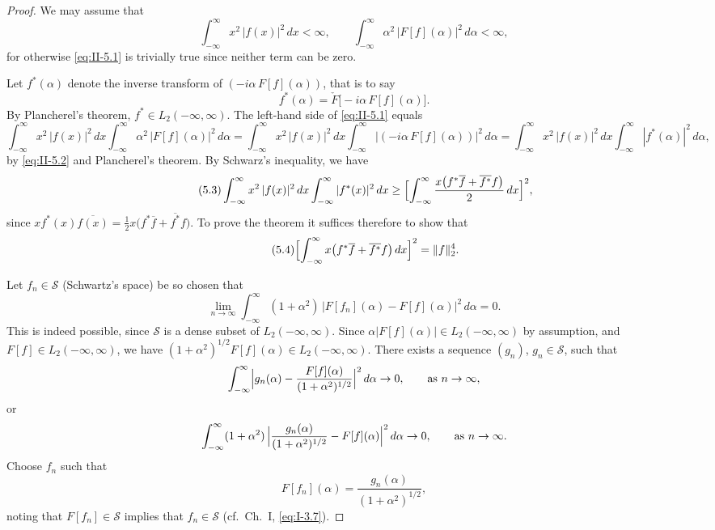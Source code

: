 \begin{proof}
We may assume that
\[
\int_{-\infty}^{\infty}x^{2}\,|f(x)|^{2}\,dx<\infty,\qquad
\int_{-\infty}^{\infty}\alpha^{2}\,|F[f](\alpha)|^{2}\,d\alpha<\infty,
\]
for otherwise \eqref{eq:II-5.1} is trivially true since neither term can be zero.

Let $f^{*}(\alpha)$ denote the inverse transform of $(-i\alpha\,F[f](\alpha))$, that is to say
\begin{equation}\tag{5.2}\label{eq:II-5.2}
f^{*}(\alpha)=\check F\bigl[-i\alpha\,F[f](\alpha)\bigr].
\end{equation}
By Plancherel's theorem, $f^{*}\in L_{2}(-\infty,\infty)$. The left-hand side of \eqref{eq:II-5.1} equals
\[
\int_{-\infty}^{\infty}x^{2}\,|f(x)|^{2}\,dx
\int_{-\infty}^{\infty}\alpha^{2}\,|F[f](\alpha)|^{2}\,d\alpha
=\int_{-\infty}^{\infty}x^{2}\,|f(x)|^{2}\,dx
\int_{-\infty}^{\infty}\bigl|(-i\alpha\,F[f](\alpha))\bigr|^{2}\,d\alpha
=\int_{-\infty}^{\infty}x^{2}\,|f(x)|^{2}\,dx
\int_{-\infty}^{\infty}|f^{*}(\alpha)|^{2}\,d\alpha,
\]
by \eqref{eq:II-5.2} and Plancherel's theorem. By Schwarz's inequality, we have
\begin{equation}\tag{5.3}\label{eq:II-5.3}
\int_{-\infty}^{\infty}x^{2}\,|f(x)|^{2}\,dx
\int_{-\infty}^{\infty}|f^{*}(x)|^{2}\,dx
\ge \Bigl[\int_{-\infty}^{\infty}\frac{x\bigl(f^{*}\overline{f}+\overline{f^{*}}f\bigr)}{2}\,dx\Bigr]^{2},
\end{equation}
since $x f^{*}(x)\overline{f(x)}=\frac{1}{2}x\bigl(f^{*}\overline{f}+\overline{f^{*}}f\bigr)$. To prove the theorem it suffices therefore to show that
\begin{equation}\tag{5.4}\label{eq:II-5.4}
\Bigl[\int_{-\infty}^{\infty}x\bigl(f^{*}\overline{f}+\overline{f^{*}}f\bigr)\,dx\Bigr]^{2}=\|f\|_{2}^{4}.
\end{equation}

Let $f_{n}\in\mathcal S$ (Schwartz's space) be so chosen that
\begin{equation}\tag{5.5}\label{eq:II-5.5}
\lim_{n\to\infty}\int_{-\infty}^{\infty}(1+\alpha^{2})\,
\bigl|F[f_{n}](\alpha)-F[f](\alpha)\bigr|^{2}\,d\alpha=0.
\end{equation}
This is indeed possible, since $\mathcal S$ is a dense subset of $L_{2}(-\infty,\infty)$. Since $\alpha|F[f](\alpha)|\in L_{2}(-\infty,\infty)$ by assumption, and $F[f]\in L_{2}(-\infty,\infty)$, we have $(1+\alpha^{2})^{1/2}F[f](\alpha)\in L_{2}(-\infty,\infty)$. There exists a sequence $(g_{n})$, $g_{n}\in\mathcal S$, such that
\[
\int_{-\infty}^{\infty}\Bigl|g_{n}(\alpha)-\frac{F[f](\alpha)}{(1+\alpha^{2})^{1/2}}\Bigr|^{2}\,d\alpha\to 0,\qquad\text{as }n\to\infty,
\]
or
\[
\int_{-\infty}^{\infty}(1+\alpha^{2})\,
\Bigl|\frac{g_{n}(\alpha)}{(1+\alpha^{2})^{1/2}}-F[f](\alpha)\Bigr|^{2}\,d\alpha\to 0,\qquad\text{as }n\to\infty.
\]
Choose $f_{n}$ such that
\[
F[f_{n}](\alpha)=\frac{g_{n}(\alpha)}{(1+\alpha^{2})^{1/2}},
\]
noting that $F[f_{n}]\in\mathcal S$ implies that $f_{n}\in\mathcal S$ (cf.\ Ch.~I, \eqref{eq:I-3.7}).


\end{proof}
